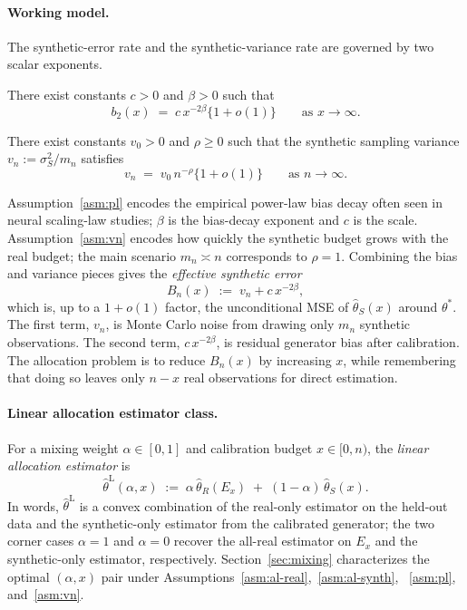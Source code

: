 \paragraph{Working model.}
The synthetic-error rate and the synthetic-variance rate are governed by two scalar exponents.

\begin{assumption}\label{asm:pl}
There exist constants $c>0$ and $\beta>0$ such that
\begin{equation*}
b_2(x)\;=\;c\,x^{-2\beta}\bigl\{1+o(1)\bigr\}\qquad\text{as }x\to\infty.
\end{equation*}
\end{assumption}

\begin{assumption}\label{asm:vn}
There exist constants $v_0>0$ and $\rho\ge 0$ such that the synthetic sampling variance $v_n:=\sigma_S^2/m_n$ satisfies
\begin{equation*}
v_n\;=\;v_0\,n^{-\rho}\bigl\{1+o(1)\bigr\}\qquad\text{as }n\to\infty.
\end{equation*}
\end{assumption}

Assumption~\ref{asm:pl} encodes the empirical power-law bias decay often seen in neural scaling-law studies; $\beta$ is the bias-decay exponent and $c$ is the scale. Assumption~\ref{asm:vn} encodes how quickly the synthetic budget grows with the real budget; the main scenario $m_n\asymp n$ corresponds to $\rho=1$. Combining the bias and variance pieces gives the \emph{effective synthetic error}
\begin{equation*}
B_n(x)\;:=\;v_n+c\,x^{-2\beta},
\end{equation*}
which is, up to a $1+o(1)$ factor, the unconditional MSE of $\hat\theta_S(x)$ around $\theta^*$. The first term, $v_n$, is Monte Carlo noise from drawing only $m_n$ synthetic observations. The second term, $c\,x^{-2\beta}$, is residual generator bias after calibration. The allocation problem is to reduce $B_n(x)$ by increasing $x$, while remembering that doing so leaves only $n-x$ real observations for direct estimation.

\paragraph{Linear allocation estimator class.}
For a mixing weight $\alpha\in[0,1]$ and calibration budget $x\in[0,n)$, the \emph{linear allocation estimator} is
\begin{equation}\label{eq:linest}
\hat\theta^{\mathrm{L}}(\alpha,x)\;:=\;\alpha\,\hat\theta_R(E_x)\;+\;(1-\alpha)\,\hat\theta_S(x).
\end{equation}
In words, $\hat\theta^{\mathrm{L}}$ is a convex combination of the real-only estimator on the held-out data and the synthetic-only estimator from the calibrated generator; the two corner cases $\alpha=1$ and $\alpha=0$ recover the all-real estimator on $E_x$ and the synthetic-only estimator, respectively. Section~\ref{sec:mixing} characterizes the optimal $(\alpha,x)$ pair under Assumptions~\ref{asm:al-real},~\ref{asm:al-synth}, ~\ref{asm:pl}, and~\ref{asm:vn}.


